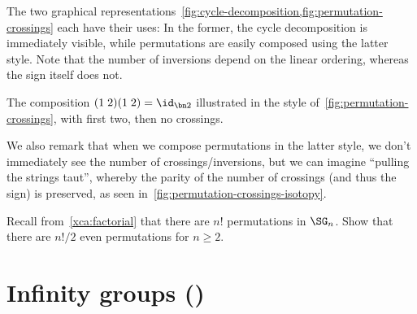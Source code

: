 \begin{remark}
  The two graphical representations~\cref{fig:cycle-decomposition,fig:permutation-crossings}
  each have their uses: In the former, the cycle decomposition is immediately
  visible, while permutations are easily composed using the latter style.
  Note that the number of inversions depend on the linear ordering,
  whereas the sign itself does not.
  \begin{marginfigure}
    \caption{The composition $(1\;2)(1\;2) = \id_{\bn 2}$ illustrated
      in the style of~\cref{fig:permutation-crossings}, with first two, then no
      crossings.}
    \label{fig:permutation-crossings-isotopy}
  \end{marginfigure}
  We also remark that when we compose permutations in the latter style,
  we don't immediately see the number of crossings/inversions, but we can imagine
  ``pulling the strings taut'', whereby the parity of the number of crossings
  (and thus the sign) is preserved, as seen in~\cref{fig:permutation-crossings-isotopy}.
\end{remark}

\begin{xca}
  Recall from~\cref{xca:factorial} that there are $n!$
  permutations in $\SG_n$.
  Show that there are $n!/2$ even permutations for $n\ge 2$.
\end{xca}

\section{Infinity groups (\texorpdfstring{\inftygps}{∞-groups})}
\label{sec:inftygps}

